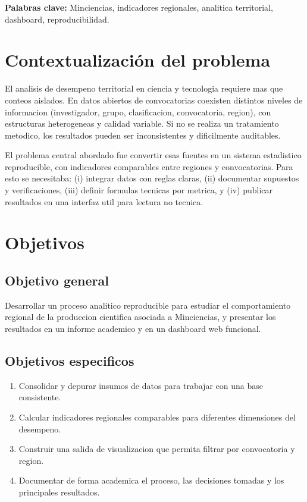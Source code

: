 \documentclass[12pt,letterpaper]{article}
\begin{document}
\textbf{Palabras clave:} Minciencias, indicadores regionales, analitica territorial, dashboard, reproducibilidad.

\section{Contextualización del problema}

El analisis de desempeno territorial en ciencia y tecnologia requiere mas que conteos aislados. En datos abiertos de convocatorias coexisten distintos niveles de informacion (investigador, grupo, clasificacion, convocatoria, region), con estructuras heterogeneas y calidad variable. Si no se realiza un tratamiento metodico, los resultados pueden ser inconsistentes y dificilmente auditables.

El problema central abordado fue convertir esas fuentes en un sistema estadistico reproducible, con indicadores comparables entre regiones y convocatorias. Para esto se necesitaba: (i) integrar datos con reglas claras, (ii) documentar supuestos y verificaciones, (iii) definir formulas tecnicas por metrica, y (iv) publicar resultados en una interfaz util para lectura no tecnica.

\section{Objetivos}

\subsection{Objetivo general}

Desarrollar un proceso analitico reproducible para estudiar el comportamiento regional de la produccion cientifica asociada a Minciencias, y presentar los resultados en un informe academico y en un dashboard web funcional.

\subsection{Objetivos especificos}

\begin{enumerate}[label=\arabic*.]
  \item Consolidar y depurar insumos de datos para trabajar con una base consistente.
  \item Calcular indicadores regionales comparables para diferentes dimensiones del desempeno.
  \item Construir una salida de visualizacion que permita filtrar por convocatoria y region.
  \item Documentar de forma academica el proceso, las decisiones tomadas y los principales resultados.
\end{enumerate}
\end{document}
